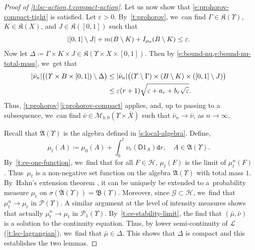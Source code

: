 \documentclass[10pt]{amsart}
\theoremstyle{definition}
\theoremstyle{remark}
\DeclarePairedDelimiter{\paren}{\lparen}{\rparen}
\DeclarePairedDelimiter{\abs}{\lvert}{\rvert}
\begin{document}
\begin{proof}[Proof of {\cref{t:lsc-action,t:compact-action}}]
Let us now show that \cref{e:prohorov-compact-tight} is satisfied.
Let $\varepsilon > 0$.
By~\cref{t:prohorov}, we~can find $\Gamma \in \mathfrak{K}(\varUpsilon)$, $K \in \mathfrak{K}(X)$, and $J \in \mathfrak{K}([0,1])$ such that
\begin{equation*}
\abs{[0,1] \setminus J} + m(B \setminus K) + I_{\mu_{0}}(B \setminus K) \leq \varepsilon .
\end{equation*}
Now let $\Delta \coloneq \Gamma \times K \times J \in \mathfrak{K}(\varUpsilon \times X \times [0,1])$.
Then by \cref{e:bound-nu,e:bound-nu-total-mass}, we~get that
\begin{equation*}
\begin{split}
\abs{\bar{\nu}_{n}}\paren[\big]{(\varUpsilon \times B \times [0,1]) \setminus \Delta} & \leq \abs{\bar{\nu}_{n}}\big(\paren{\varUpsilon \setminus \Gamma} \times (B \setminus K) \times ([0,1] \setminus J) \big)
\\
& \leq \varepsilon (r+1) \sqrt{\varepsilon + a_{r} + b_{r} \sqrt{\varepsilon}} .
\end{split}
\end{equation*}
Thus, \cref{t:prohorov}\,\cref{i:prohorov-compact} applies, and, up to passing to a subsequence, we~can find $\bar{\nu} \in \mathscr{M}_{b,0}(\varUpsilon \times \bar{X})$ such that $\bar{\nu}_{n} \to \bar{\nu}$, as $n \to \infty$.

Recall that $\mathfrak{A}(\varUpsilon)$ is the algebra defined in \cref{s:local-algebra}.
Define,
\begin{equation*}
\mu_{t}(A) \coloneq \mu_{0}(A) + \int_{0}^{t} \nu_{r}(\mathsf{D} 1_{A}) \mathtt{d} r, \quad A \in \mathfrak{A}(\varUpsilon).
\end{equation*}
By~\cref{t:ce-one-function}, we~find that for all $F \in \mathscr{H}$, $\mu_{t}(F)$ is the limit of $\mu^{n}_{t}(F)$.
Thus~$\mu_{t}$ is a non-negative set function on the algebra $\mathfrak{A}(\varUpsilon)$ with total mass $1$.
By~Hahn's extension theorem \cite[Th.\,III.5.8, p.\,136]{DunfordSchwartz}, it can be uniquely be extended to a~probability measure $\mu_{t}$ on $\sigma(\mathfrak{A}(\varUpsilon)) = \mathfrak{B}(\varUpsilon)$.
Moreover, since $\mathscr{G} \subset \mathscr{H}$, we~find that $\mu^{n}_{t} \to \mu_{t}$ in $\mathscr{P}(\varUpsilon)$.
A similar argument at the level of intensity measures shows that actually $\mu^{n}_{t} \to \mu_{t}$ in $\mathscr{P}_{1}(\varUpsilon)$.
By~\cref{t:ce-stability-limit}, the find that $(\bar{\mu}, \bar{\nu})$ is a solution to the continuity equation.
Thus, by lower semi-continuity of $\mathcal{L}$ (\cref{t:lsc-lagrangian}), we~find that $\bar{\mu} \in \Delta$.
This shows that $\Delta$ is compact and this establishes the two lemmas.
\end{proof}
\end{document}
